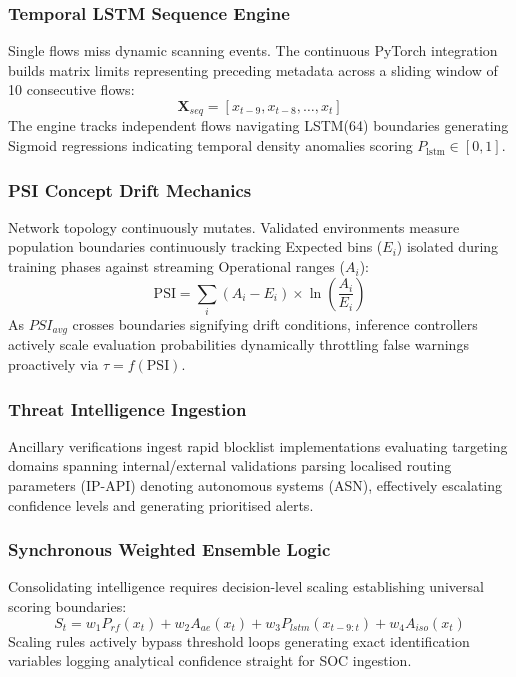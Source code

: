 \documentclass[conference]{IEEEtran}
\begin{document}
\subsubsection{Temporal LSTM Sequence Engine}
Single flows miss dynamic scanning events. The continuous PyTorch integration builds matrix limits representing preceding metadata across a sliding window of 10 consecutive flows:
\begin{equation}
    \mathbf{X}_{seq} = [x_{t-9}, x_{t-8}, \dots, x_t]
\end{equation}
The engine tracks independent flows navigating LSTM(64) boundaries generating Sigmoid regressions indicating temporal density anomalies scoring $P_{\text{lstm}} \in [0,1]$.

\subsubsection{PSI Concept Drift Mechanics}
Network topology continuously mutates. Validated environments measure population boundaries continuously tracking Expected bins ($E_i$) isolated during training phases against streaming Operational ranges ($A_i$):
\begin{equation}
    \text{PSI} = \sum_{i} \left( A_i - E_i \right) \times \ln\left(\frac{A_i}{E_i}\right)
\end{equation}
As $PSI_{avg}$ crosses boundaries signifying drift conditions, inference controllers actively scale evaluation probabilities dynamically throttling false warnings proactively via $\tau = f(\text{PSI})$.

\subsubsection{Threat Intelligence Ingestion}
Ancillary verifications ingest rapid blocklist implementations evaluating targeting domains spanning internal/external validations parsing localised routing parameters (IP-API) denoting autonomous systems (ASN), effectively escalating confidence levels and generating prioritised alerts.

\subsubsection{Synchronous Weighted Ensemble Logic}
Consolidating intelligence requires decision-level scaling establishing universal scoring boundaries:
\begin{equation}
    S_t = w_1 P_{rf}(x_t) + w_2 A_{ae}(x_t) + w_3 P_{lstm}(x_{t-9:t}) + w_4 A_{iso}(x_t)
\end{equation}
Scaling rules actively bypass threshold loops generating exact identification variables logging analytical confidence straight for SOC ingestion.
\end{document}
